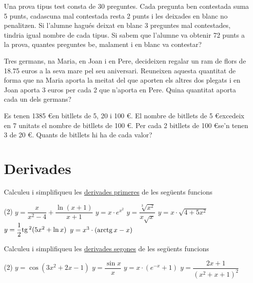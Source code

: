 \documentclass[11pt, a4paper, pdf]{article}
\let\frac\dfrac
\begin{document}
\begin{mylist}
	
	\item Una prova tipus test consta de 30 preguntes. Cada pregunta ben contestada suma 5 punts, cadascuna mal contestada resta 2 punts i les deixades en blanc no penalitzen. Si l'alumne hagués deixat en blanc 3 preguntes mal contestades, tindria igual nombre de cada tipus. Si sabem que l'alumne va obtenir 72 punts a la prova, quantes preguntes be, malament i en blanc va contestar? 
	
	\item Tres germans, na Maria, en Joan i en Pere, decideixen regalar un ram de flors de 18.75 euros a la seva mare pel seu aniversari. Reuneixen aquesta quantitat de forma que na Maria aporta la meitat del que aporten els altres dos plegats i en Joan aporta 3 euros per cada 2 que n’aporta en Pere. Quina quantitat aporta cada un dels germans? 
	
	\item Es tenen 1385 \euro en bitllets de 5, 20 i 100 \euro. El nombre de bitllets de 5 \euro excedeix en 7 unitats el nombre de bitllets de 100 \euro. Per cada 2 bitllets de 100 \euro se’n tenen 3 de 20 \euro. Quants de bitllets hi ha de cada valor? 
	
			
\end{mylist}	 
	 
	 
\section{Derivades}

\begin{mylist}
	
	\item Calculeu i simplifiqueu les \underline{derivades primeres} de les següents funcions
	\begin{tasks}(2)
		\task  $y=\frac{x}{x^2-4} + \frac{\ln (x+1)}{x+1}$
		\task $y=x\cdot e^{x^2}$
		\task $y = \frac{\sqrt[3]{x^2}}{ x \sqrt{x} }$
		\task $y = x \cdot \sqrt{4+5x^2}$
		\task  $y=\frac{1}{2}\tg^2 (5x^2+\ln x)$
		\task  $y=x^3 \cdot (\mathrm{arctg}\, x - x) $
	\end{tasks}
	
	\item Calculeu i simplifiqueu les \underline{derivades segones} de les següents funcions
	\begin{tasks}(2)
		\task $y=\cos (3 x^2+2x-1)$
		\task $y=\frac{\sin x}{x}$
		\task $y=x\cdot (e^{-x}+1)$
		\task $y=\frac{2x+1}{(x^2+x+1)^2}$
	\end{tasks}
\end{mylist}
\end{document}
